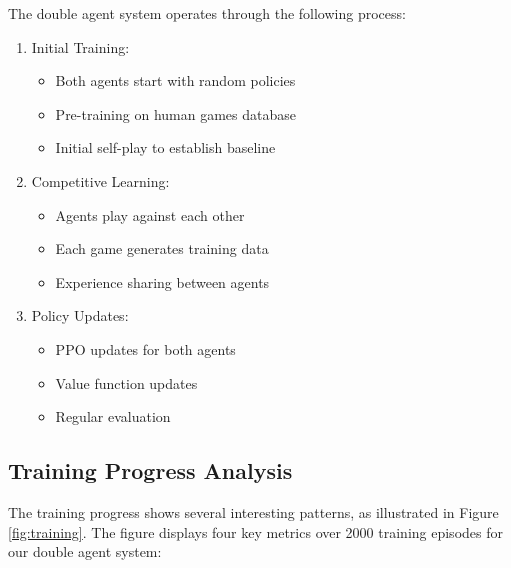 \documentclass[conference]{IEEEtran}
\begin{document}
The double agent system operates through the following process:

\begin{enumerate}
\item Initial Training:
   \begin{itemize}
   \item Both agents start with random policies
   \item Pre-training on human games database
   \item Initial self-play to establish baseline
   \end{itemize}

\item Competitive Learning:
   \begin{itemize}
   \item Agents play against each other
   \item Each game generates training data
   \item Experience sharing between agents
   \end{itemize}

\item Policy Updates:
   \begin{itemize}
   \item PPO updates for both agents
   \item Value function updates
   \item Regular evaluation
   \end{itemize}
\end{enumerate}

\subsection{Training Progress Analysis}
The training progress shows several interesting patterns, as illustrated in Figure \ref{fig:training}. The figure displays four key metrics over 2000 training episodes for our double agent system:
\end{document}
